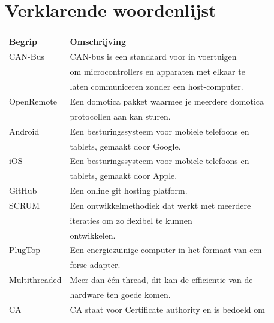 \documentclass[]{article}
\begin{document}
\newpage
\section{Verklarende woordenlijst}

\begin{tabular}{|| l | l ||}\hline
    Begrip           & Omschrijving                                         \\\hline\hline
    CAN-Bus          & CAN-bus is een standaard voor in voertuigen          \\
                     & om microcontrollers en apparaten met elkaar te       \\
                     & laten communiceren zonder een host-computer.        \\\hline
    OpenRemote       & Een domotica pakket waarmee je meerdere domotica     \\
                     & protocollen aan kan sturen.                          \\\hline
    Android          & Een besturingssysteem voor mobiele telefoons en      \\
                     & tablets, gemaakt door Google.                        \\\hline
    iOS              & Een besturingssysteem voor mobiele telefoons en      \\
                     & tablets, gemaakt door Apple.                         \\\hline
    GitHub           & Een online git hosting platform.                     \\\hline
    SCRUM            & Een ontwikkelmethodiek dat werkt met meerdere        \\
                     & iteraties om zo flexibel te kunnen                   \\
                     & ontwikkelen.                                         \\\hline
    PlugTop          & Een energiezuinige computer in het formaat van een   \\
                     & forse adapter.                                       \\\hline
    Multithreaded    & Meer dan \'e\'en thread, dit kan de efficientie van de   \\
                     & hardware ten goede komen.                            \\\hline
    CA               & CA staat voor Certificate authority en is bedoeld om \\

\end{tabular}
\end{document}
